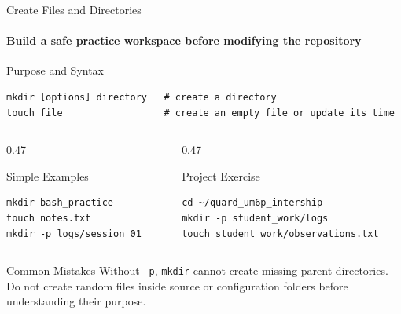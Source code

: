 \begin{frame}[fragile]{Create Files and Directories}
\framesubtitle{Build a safe practice workspace before modifying the repository}

\footnotesize

\begin{block}{Purpose and Syntax}
\begin{verbatim}
mkdir [options] directory   # create a directory
touch file                  # create an empty file or update its time
\end{verbatim}
\end{block}

\begin{columns}[T,onlytextwidth]
    \begin{column}{0.47\textwidth}
        \begin{exampleblock}{Simple Examples}
\begin{verbatim}
mkdir bash_practice
touch notes.txt
mkdir -p logs/session_01
\end{verbatim}
        \end{exampleblock}
    \end{column}

    \begin{column}{0.47\textwidth}
        \begin{exampleblock}{Project Exercise}
\begin{verbatim}
cd ~/quard_um6p_intership
mkdir -p student_work/logs
touch student_work/observations.txt
\end{verbatim}
        \end{exampleblock}
    \end{column}
\end{columns}

\begin{alertblock}{Common Mistakes}
Without \texttt{-p}, \texttt{mkdir} cannot create missing parent directories.
Do not create random files inside source or configuration folders before
understanding their purpose.
\end{alertblock}
\end{frame}

